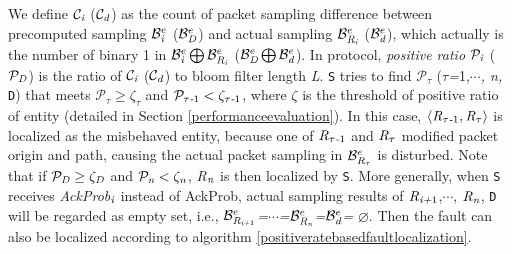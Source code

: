 We define $\mathcal{C}_\emph{i}$ ($\mathcal{C}_\emph{d}$) as the count of packet sampling difference between precomputed sampling $\mathcal{B}_{\emph{i}}^e$ ($\mathcal{B}_{\emph{D}}^e$) and actual sampling $\mathcal{B}_{\emph{R}_\emph{i}}^e$ ($\mathcal{B}_{\emph{d}}^e$), which actually is the number of binary 1 in $\mathcal{B}_{\emph{i}}^e \bigoplus \mathcal{B}_{\emph{R}_\emph{i}}^e$ ($\mathcal{B}_{\emph{D}}^e \bigoplus \mathcal{B}_{\emph{d}}^e$).
In \name{} protocol, \emph{positive ratio} $\mathcal{P}_\emph{i}$ ($\mathcal{P}_\emph{D}$) is the ratio of $\mathcal{C}_\emph{i}$ ($\mathcal{C}_\emph{d}$) to bloom filter length \emph{L}. {\tt S} tries to find $\mathcal{P}_\tau$ ($\tau$\emph{=}1,$\cdots$\emph{, n,} {\tt D}) that meets $\mathcal{P}_\tau\geq\zeta_\tau$ and $\mathcal{P}_{\tau\emph{-}1}<\zeta_{\tau\emph{-}1}$, where $\zeta$ is the threshold of positive ratio of entity (detailed in Section \ref{performanceevaluation}). In this case, $\langle \emph{R}_{\tau\emph{-}1}, \emph{R}_{\tau} \rangle$ is localized as the misbehaved entity, because one of $\emph{R}_{\tau\emph{-}1}$ and $\emph{R}_{\tau}$ modified packet origin and path, causing the actual packet sampling in $\mathcal{B}_{\emph{R}_{\tau}}^e$ is disturbed. Note that if $\mathcal{P}_{\emph{D}}\geq\zeta_\emph{D}$ and $\mathcal{P}_{\emph{n}}<\zeta_\emph{n}$, \emph{R}$_\emph{n}$ is then localized by {\tt S}.
More generally, when {\tt S} receives \emph{AckProb}$_\emph{i}$ instead of AckProb, actual sampling results of $\emph{R}_{\emph{i+}1}$,$\cdots$, $\emph{R}_\emph{n}$, {\tt D} will be regarded as empty set, i.e., $\mathcal{B}_{\emph{R}_{\emph{i+}1}}^e$\emph{=}$\cdots$\emph{=}$\mathcal{B}_{\emph{R}_\emph{n}}^e$\emph{=}$\mathcal{B}_{\emph{d}}^e$\emph{=} $\varnothing$. Then the fault can also be localized according to algorithm \ref{positiveratebasedfaultlocalization}.
